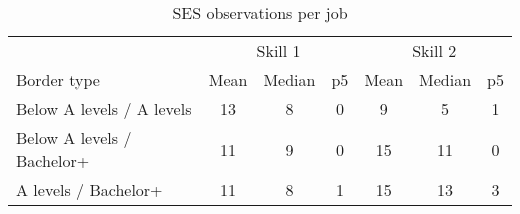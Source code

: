 \begin{table}
	\caption{SES observations per job}
	\label{tab:sesBorderJobs}
	\centering
	\begin{tabular}{lcccccc}
	
& \multicolumn{3}{c}{Skill 1}& \multicolumn{3}{c}{Skill 2}\\
Border type & Mean & Median& p5 & Mean & Median & p5 \\
\midrule
Below A levels / A levels&13&8&0&9&5&1 \\
Below A levels / Bachelor+&11&9&0&15&11&0 \\
A levels / Bachelor+&11&8&1&15&13&3 \\
\bottomrule
\end{tabular}
\end{table}

